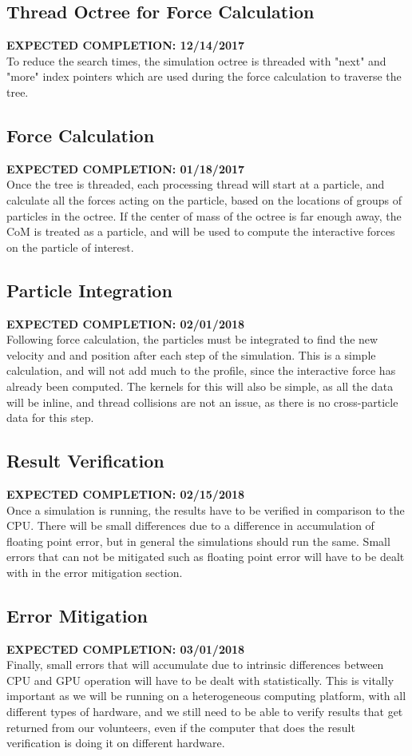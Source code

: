 \documentclass[fleqn,10pt]{SelfArx} %
\begin{document}
\subsection{Thread Octree for Force Calculation}
\textbf{EXPECTED COMPLETION: 12/14/2017}\\
To reduce the search times, the simulation octree is threaded with "next" and "more" index pointers which are used during the force calculation to traverse the tree. 


\subsection{Force Calculation}
\textbf{EXPECTED COMPLETION: 01/18/2017}\\
Once the tree is threaded, each processing thread will start at a particle, and calculate all the forces acting on the particle, based on the locations of groups of particles in the octree. If the center of mass of the octree is far enough away, the CoM is treated as a particle, and will be used to compute the interactive forces on the particle of interest.

\subsection{Particle Integration}
\textbf{EXPECTED COMPLETION: 02/01/2018}\\
Following force calculation, the particles must be integrated to find the new velocity and and position after each step of the simulation. This is a simple calculation, and will not add much to the profile, since the interactive force has already been computed. The kernels for this will also be simple, as all the data will be inline, and thread collisions are not an issue, as there is no cross-particle data for this step.

\subsection{Result Verification}
\textbf{EXPECTED COMPLETION: 02/15/2018}\\
Once a simulation is running, the results have to be verified in comparison to the CPU. There will be small differences due to a difference in accumulation of floating point error, but in general the simulations should run the same. Small errors that can not be mitigated such as floating point error will have to be dealt with in the error mitigation section.

\subsection{Error Mitigation}
\textbf{EXPECTED COMPLETION: 03/01/2018}\\
Finally, small errors that will accumulate due to intrinsic differences between CPU and GPU operation will have to be dealt with statistically. This is vitally important as we will be running on a heterogeneous computing platform, with all different types of hardware, and we still need to be able to verify results that get returned from our volunteers, even if the computer that does the result verification is doing it on different hardware.
\end{document}
